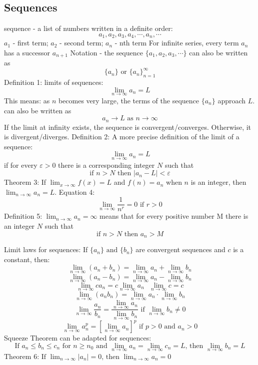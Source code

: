 \documentclass{article}
\begin{document}
    \subsection{Sequences} %
    \begin{outline}
        \1 sequence - a list of numbers written in a definite order: \[a_1, a_2, a_3, a_4, \cdots, a_n, \cdots \]
        \1 $a_1$ - first term; $a_2$ - second term; $a_n$ - nth term 
        \1 For infinite series, every term $a_n$ has a successor $a_{n+1}$
        \1 Notation - the sequence \(\{a_1, a_2, a_3, \cdots\}\) can also be written as \[\{a_n\}\text{ or }\{a_n\}^\infty_{n=1}\] 
        \1 Definition 1: limits of sequences: \[\lim_{n\to\infty}a_n=L\]
            \2 This means: as $n$ becomes very large, the terms of the sequence $\{a_n\}$ approach $L$. 
        \1 can also be written as \[a_n\to L \text{ as } n\to\infty\]
        \1 If the limit at infinity exists, the sequence is convergent/converges. Otherwise, it is divergent/diverges. 
        \1 Definition 2: A more precise definition of the limit of a sequence: \[\lim_{n\to\infty}a_n=L\] if for every \(\varepsilon>0\) there is a corresponding integer $N$ such that \[\text{if }n>N\text{ then }|a_n-L|<\varepsilon\]
        \1 Theorem 3: If \(\lim_{x\to\infty}f(x)=L\) and \(f(n)=a_n\) when $n$ is an integer, then \(\lim_{n\to\infty}a_n=L\). 
        \1 Equation 4: \[\lim_{n\to\infty}\dfrac{1}{n^r}=0\text{    if }r>0\]
        \1 Definition 5: \(\lim_{n\to\infty}a_n=\infty\) means that for every positive number M there is an integer $N$ such that \[\text{if }n>N\text{ then }a_n>M\]
    \end{outline}
    \begin{outline}
        \1 Limit laws for sequences: If \(\{a_n\}\text{ and }\{b_n\}\) are convergent sequences and $c$ is a constant, then: \[\lim_{n\to\infty}(a_n+b_n)=\lim_{n\to\infty}a_n+\lim_{n\to\infty}b_n\]\[\lim_{n\to\infty}(a_n-b_n)=\lim_{n\to\infty}a_n-\lim_{n\to\infty}b_n\]\[\lim_{n\to\infty}ca_n=c\lim_{n\to\infty}a_n\text{    }\lim_{n\to\infty}c=c\]\[\lim_{n\to\infty}(a_nb_n)=\lim_{n\to\infty}a_n\cdot\lim_{n\to\infty}b_n\]\[\lim_{n\to\infty}\dfrac{a_n}{b_n}=\dfrac{\lim_{n\to\infty}a_n}{\lim_{n\to\infty}b_n}\text{ if }\lim_{n\to\infty}b_n\neq0\]\[\lim_{n\to\infty}a_n^p=\left[\lim_{n\to\infty}a_n\right]^p\text{ if }p>0\text{ and }a_n>0\]
        \1 Squeeze Theorem can be adapted for sequences: \[\text{If }a_n\leq b_n\leq c_n\text{ for }n\geq n_0\text{ and }\lim_{n\to\infty}a_n=\lim_{n\to\infty}c_n=L\text{, then }\lim_{n\to\infty}b_n=L\]
        \1 Theorem 6: \(\text{If }\lim_{n\to\infty}|a_n|=0\text{, then }\lim_{n\to\infty}a_n=0\)
    \end{outline}
\end{document}
